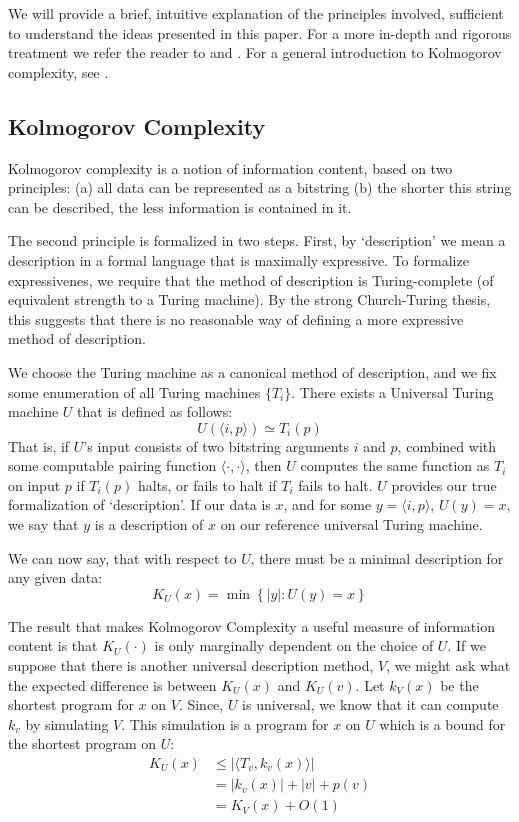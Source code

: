 \documentclass{article}
\begin{document}
We will provide a brief, intuitive explanation of the principles involved, sufficient to understand the ideas presented in this paper. For a more in-depth and rigorous treatment we refer the reader to \cite{li2004similarity} and \cite{cilibrasi2005clustering}. For a general introduction to Kolmogorov complexity, see \cite{li1997introduction}.

\subsection*{Kolmogorov Complexity}

Kolmogorov complexity is a notion of information content, based on two principles: (a) all data can be represented as a bitstring (b) the shorter this string can be described, the less information is contained in it.

The second principle is formalized in two steps. First, by `description' we mean a description in a formal language that is maximally expressive. To formalize expressivenes, we require that the method of description is Turing-complete (of equivalent strength to a Turing machine). By the strong Church-Turing thesis, this suggests that there is no reasonable way of defining a more expressive method of description.

We choose the Turing machine as a canonical method of description, and we fix some enumeration of all Turing machines $\{T_i\}$. There exists a Universal Turing machine $U$ that is defined as follows:
\[
U(\langle i, p\rangle) \simeq T_i(p)
\] 
That is, if $U$'s input consists of two bitstring arguments $i$ and $p$, combined with some computable pairing function $\langle \cdot, \cdot\rangle$, then $U$ computes the same function as $T_i$ on input $p$ if $T_i(p)$ halts, or fails to halt if $T_i$ fails to halt. $U$ provides our true formalization of `description'. If our data is $x$, and for some $y = \langle i, p\rangle$, $U(y) = x$, we say that $y$ is a description of $x$ on our reference universal Turing machine.  

We can now say, that with respect to $U$, there must be a minimal description for any given data:
\[
K_U(x) = \min\left \{|y| : U(y) = x\right\} 
\]

The result that makes Kolmogorov Complexity a useful measure of information content is that $K_U(\cdot)$ is only marginally dependent on the choice of $U$. If we suppose that there is another universal description method, $V$, we might ask what the expected difference is between $K_U(x)$ and $K_U(v)$. Let $k_V(x)$ be the shortest program for $x$ on $V$. Since, $U$ is universal, we know that it can compute $k_v$ by simulating $V$. This simulation is a program for $x$ on $U$ which is a bound for the shortest program on $U$:
\begin{align*}
K_U(x) 	&\leq |\langle T_v, k_v(x)\rangle|\\ 
		&=  |k_v(x)| + |v| + p(v) \\
		&=  K_V(x) + O(1)
\end{align*}
\end{document}
